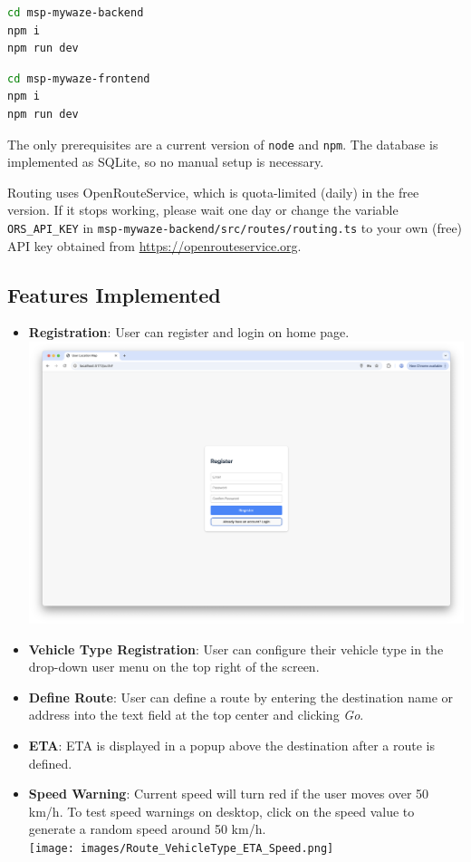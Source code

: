 \documentclass{article}
\begin{document}
\begin{lstlisting}[language=bash]
cd msp-mywaze-backend
npm i
npm run dev
\end{lstlisting}

\begin{lstlisting}[language=bash]
cd msp-mywaze-frontend
npm i
npm run dev
\end{lstlisting}

The only prerequisites are a current version of \texttt{node} and \texttt{npm}. The database is implemented as SQLite, so no manual setup is necessary.

Routing uses OpenRouteService, which is quota-limited (daily) in the free version. If it stops working, please wait one day or change the variable \texttt{ORS\_API\_KEY} in \texttt{msp-mywaze-backend/src/routes/routing.ts} to your own (free) API key obtained from \url{https://openrouteservice.org}.

\subsection*{Features Implemented}

\begin{itemize}
    \item \textbf{Registration}: User can register and login on home page.\\[0.5em]
    \includegraphics[width=\textwidth]{images/Registration.png}

    \item \textbf{Vehicle Type Registration}: User can configure their vehicle type in the drop-down user menu on the top right of the screen.

    \item \textbf{Define Route}: User can define a route by entering the destination name or address into the text field at the top center and clicking \textit{Go}.

    \item \textbf{ETA}: ETA is displayed in a popup above the destination after a route is defined.

    \item \textbf{Speed Warning}: Current speed will turn red if the user moves over 50 km/h. To test speed warnings on desktop, click on the speed value to generate a random speed around 50 km/h.\\[0.5em]
    \texttt{[image: images/Route\_VehicleType\_ETA\_Speed.png]}
\end{itemize}
\end{document}
